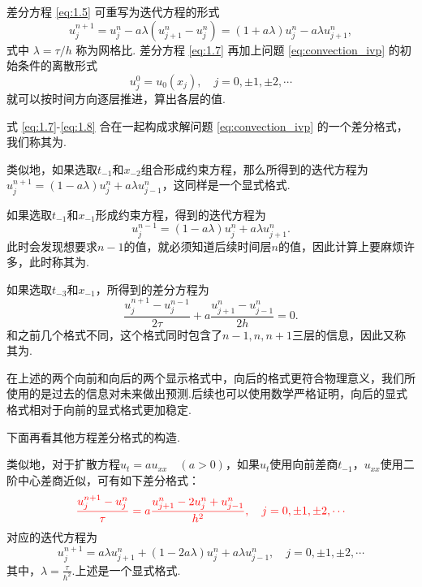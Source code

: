 差分方程 \eqref{eq:1.5} 可重写为迭代方程的形式
\begin{equation}
    u_j^{n+1} = u_j^n - a\lambda(u_{j+1}^n - u_j^n)=(1+a\lambda)u_j^n - a\lambda u_{j+1}^n, \label{eq:1.7}
\end{equation}
式中 $\lambda = \tau/h$ 称为网格比. 差分方程 \eqref{eq:1.7} 再加上问题 \eqref{eq:convection_ivp} 的初始条件的离散形式
\begin{equation}
    u_j^0 = u_0(x_j), \quad j = 0, \pm 1, \pm 2, \cdots \label{eq:1.8}
\end{equation}
就可以按时间方向逐层推进，算出各层的值.\par
式 \eqref{eq:1.7}-\eqref{eq:1.8} 合在一起构成求解问题 \eqref{eq:convection_ivp} 的一个差分格式，我们称其为.\par
类似地，如果选取$t_{-1}$和$x_{-2}$组合形成约束方程，那么所得到的迭代方程为
$u_j^{n+1}=(1-a\lambda)u_j^n+a\lambda u_{j-1}^n$，这同样是一个显式格式.\par
如果选取$t_{-1}$和$x_{-1}$形成约束方程，得到的迭代方程为
\begin{equation}
u_j^{n-1}=(1-a\lambda)u_j^n+a\lambda u_{j+1}^n.
\end{equation}
此时会发现想要求$n-1$的值，就必须知道后续时间层$n$的值，因此计算上要麻烦许多，此时称其为.\par
如果选取$t_{-3}$和$x_{-1}$，所得到的差分方程为
\begin{equation}
    \frac{u_j^{n+1} - u_j^{n-1}}{2\tau} + a \frac{u_{j+1}^n - u_{j-1}^n}{2h} = 0.
\end{equation}
和之前几个格式不同，这个格式同时包含了$n-1,n,n+1$三层的信息，因此又称其为.\par
在上述的两个向前和向后的两个显示格式中，向后的格式更符合物理意义，我们所使用的是过去的信息对未来做出预测.后续也可以使用数学严格证明，向后的显式格式相对于向前的显式格式更加稳定.\par
下面再看其他方程差分格式的构造.
\begin{instance}
    类似地，对于扩散方程$u_t = a u_{xx} \quad (a > 0)$，如果$u_t$使用向前差商$t_{-1}$，$u_{xx}$使用二阶中心差商近似，可有如下差分格式：
\begin{equation}
    {\color{red} \frac{u_j^{n+1} - u_j^n}{\tau} = a \frac{u_{j+1}^n - 2u_j^n + u_{j-1}^n}{h^2}, \quad j = 0, \pm 1, \pm 2, \cdots } \label{eq:1.9}
\end{equation}
对应的迭代方程为
\begin{equation}
    u_j^{n+1} = a\lambda u_{j+1}^n +(1-2a\lambda)u_j^n + a\lambda u_{j-1}^n, \quad j = 0, \pm 1, \pm 2, \cdots 
\end{equation}
其中，$\lambda=\frac{\tau}{h^2}$.上述是一个显式格式.
\end{instance}


